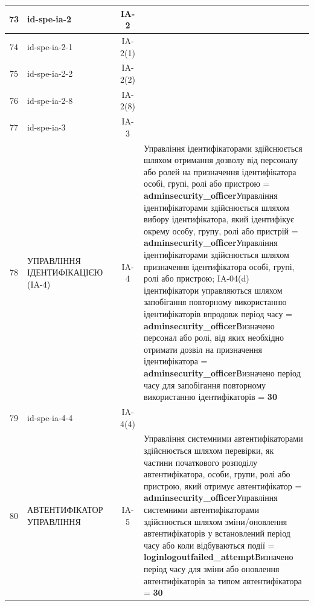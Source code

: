 \documentclass[10pt]{article}
\begin{document}
\begin{longtable}{|c|>{\raggedright\arraybackslash}p{2.5cm}|>{\raggedright\arraybackslash}p{4.5cm}|c|>{\raggedright\arraybackslash}p{4.5cm}|}
73 & id-spe-ia-2 &  & IA-2 &  \\ \hline
74 & id-spe-ia-2-1 &  & IA-2(1) &  \\ \hline
75 & id-spe-ia-2-2 &  & IA-2(2) &  \\ \hline
76 & id-spe-ia-2-8 &  & IA-2(8) &  \\ \hline
77 & id-spe-ia-3 &  & IA-3 &  \\ \hline
78 & УПРАВЛІННЯ ІДЕНТИФІКАЦІЄЮ (IA-4) &  & IA-4 & Управління ідентифікаторами здійснюється шляхом отримання дозволу від персоналу або ролей на призначення ідентифікатора особі, групі, ролі або пристрою = \textbf{adminsecurity\_\allowbreak{}officer}\newline Управління ідентифікаторами здійснюється шляхом вибору ідентифікатора, який ідентифікує окрему особу, групу, ролі або пристрій = \textbf{adminsecurity\_\allowbreak{}officer}\newline Управління ідентифікаторами здійснюється шляхом призначення ідентифікатора особі, групі, ролі або пристрою; IA-04(d) ідентифікатори управляються шляхом запобігання повторному використанню ідентифікаторів впродовж період часу = \textbf{adminsecurity\_\allowbreak{}officer}\newline Визначено персонал або ролі, від яких необхідно отримати дозвіл на призначення ідентифікатора = \textbf{adminsecurity\_\allowbreak{}officer}\newline Визначено період часу для запобігання повторному використанню ідентифікаторів = \textbf{30} \\ \hline
79 & id-spe-ia-4-4 &  & IA-4(4) &  \\ \hline
80 & АВТЕНТИФІКАТОР УПРАВЛІННЯ &  & IA-5 & Управління системними автентифікаторами здійснюється шляхом перевірки, як частини початкового розподілу автентифікатора, особи, групи, ролі або пристрою, який отримує автентифікатор = \textbf{adminsecurity\_\allowbreak{}officer}\newline Управління системними автентифікаторами здійснюється шляхом зміни/оновлення автентифікаторів у встановлений період часу або коли відбуваються події = \textbf{loginlogoutfailed\_\allowbreak{}attempt}\newline Визначено період часу для зміни або оновлення автентифікаторів за типом автентифікатора = \textbf{30} \\ \hline

\end{longtable}
\end{document}
